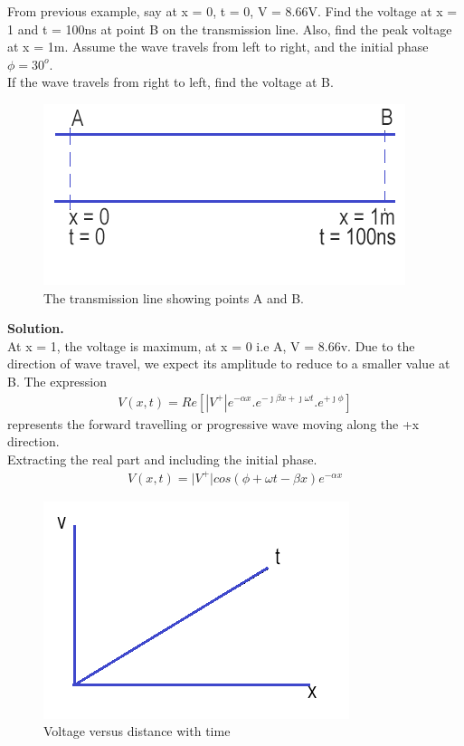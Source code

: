 \begin{exmp}
From previous example, say at x = 0, t = 0, V = 8.66V. Find the voltage at x = 1 and t = 100ns at point B on the transmission line. Also, find the peak voltage at x = 1m. Assume the wave travels from left to right, and the initial phase $\phi = 30^o$.\\
If the wave travels from right to left, find the voltage at B.
\begin{figure}[h]
\centering
\includegraphics[width=1\linewidth]{./graphics/TL}
\caption{The transmission line showing points A and B.}
\end{figure}

\textbf{Solution.} \\ 
At x = 1, the voltage is maximum, at x = 0 i.e A, V = 8.66v. Due to the direction of wave travel, we expect its amplitude to reduce to a smaller value at B. The expression
\begin{align}
V(x,t) = Re{[\left| V^+\right|  e^{-\alpha x}.e^{-\jmath\beta x + \jmath\omega t}.e^{+\jmath\phi}]} 
\label{eqn:voltagesoln}
\end{align}
represents the forward travelling or progressive wave moving along the +x direction.\\
Extracting the real part and including the initial phase.
\begin{align*}
V(x,t) = \lvert V^+\rvert cos(\phi + \omega t - \beta x)e^{-\alpha x}
\end{align*}
\begin{figure}[h]
\centering
\includegraphics[scale=0.5]{./graphics/VversusX}
\caption{Voltage versus distance with time}
\end{figure}


\end{exmp}
